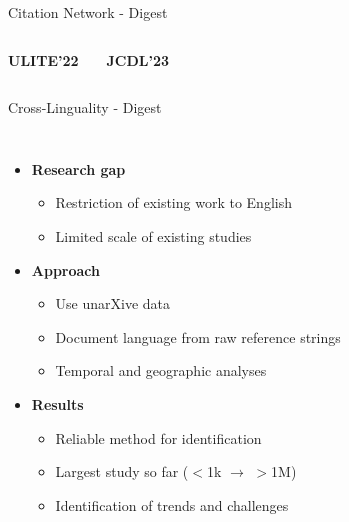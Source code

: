 \documentclass[en,16:9,smallfoot]{sdqbeamer}
\begin{document}
\begin{frame}{Citation Network - Digest}
\begin{columns}
           \begin{infobox-pub-small}
           \textbf{ULITE'22}~\cite{Saier2022ULITE}
           \end{infobox-pub-small}
           \vspace{-0.5em}
           \begin{infobox-pub-small}
           \textbf{JCDL'23}~\cite{Saier2023unarXive}
           \end{infobox-pub-small}
   \end{columns}
   \end{frame}

   \begin{frame}{Cross-Linguality - Digest}

   \begin{columns}
        \vspace{-1cm}
        \begin{itemize}
            \item \textbf{Research gap}
            \begin{itemize}
                \item Restriction of existing work to English
                \item Limited scale of existing studies
            \end{itemize}
            \item \textbf{Approach}
            \begin{itemize}
                \item Use unarXive data
                \item Document language from raw reference strings
                \item Temporal and geographic analyses
            \end{itemize}
            \item \textbf{Results}
            \begin{itemize}
                \item Reliable method for identification
                \item Largest study so far ($<$1k $\rightarrow$ $>$1M)
                \item Identification of trends and challenges
            \end{itemize}
        \end{itemize}

\end{columns}
\end{frame}
\end{document}
